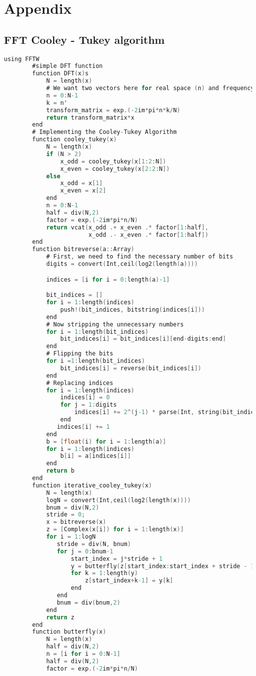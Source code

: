\appendix

\chapter{Appendix}

\label{ch:Appendix}

	\section{FFT Cooley - Tukey algorithm}
	\label{Cooley-Tukey_Code} 

	\begin{lstlisting}[language=C, caption= Cooley-Tukey with Butterfly Diagrams ]
		using FFTW
		#simple DFT function
		function DFT(x)s
		    N = length(x)
		    # We want two vectors here for real space (n) and frequency space (k)
		    n = 0:N-1
		    k = n'
		    transform_matrix = exp.(-2im*pi*n*k/N)
		    return transform_matrix*x
		end
		# Implementing the Cooley-Tukey Algorithm
		function cooley_tukey(x)
		    N = length(x)
		    if (N > 2)
		        x_odd = cooley_tukey(x[1:2:N])
		        x_even = cooley_tukey(x[2:2:N])
		    else
		        x_odd = x[1]
		        x_even = x[2]
		    end
		    n = 0:N-1
		    half = div(N,2)
		    factor = exp.(-2im*pi*n/N)
		    return vcat(x_odd .+ x_even .* factor[1:half],
		                x_odd .- x_even .* factor[1:half])
		end
		function bitreverse(a::Array)
		    # First, we need to find the necessary number of bits
		    digits = convert(Int,ceil(log2(length(a))))

		    indices = [i for i = 0:length(a)-1]

		    bit_indices = []
		    for i = 1:length(indices)
		        push!(bit_indices, bitstring(indices[i]))
		    end
		    # Now stripping the unnecessary numbers
		    for i = 1:length(bit_indices)
		        bit_indices[i] = bit_indices[i][end-digits:end]
		    end
		    # Flipping the bits
		    for i =1:length(bit_indices)
		        bit_indices[i] = reverse(bit_indices[i])
		    end
		    # Replacing indices
		    for i = 1:length(indices)
		        indices[i] = 0
		        for j = 1:digits
		            indices[i] += 2^(j-1) * parse(Int, string(bit_indices[i][end-j]))
		        end
		       indices[i] += 1
		    end
		    b = [float(i) for i = 1:length(a)]
		    for i = 1:length(indices)
		        b[i] = a[indices[i]]
		    end
		    return b
		end
		function iterative_cooley_tukey(x)
		    N = length(x)
		    logN = convert(Int,ceil(log2(length(x))))
		    bnum = div(N,2)
		    stride = 0;
		    x = bitreverse(x)
		    z = [Complex(x[i]) for i = 1:length(x)]
		    for i = 1:logN
		       stride = div(N, bnum)
		       for j = 0:bnum-1
		           start_index = j*stride + 1
		           y = butterfly(z[start_index:start_index + stride - 1])
		           for k = 1:length(y)
		               z[start_index+k-1] = y[k]
		           end
		       end
		       bnum = div(bnum,2)
		    end
		    return z
		end
		function butterfly(x)
		    N = length(x)
		    half = div(N,2)
		    n = [i for i = 0:N-1]
		    half = div(N,2)
		    factor = exp.(-2im*pi*n/N)


\end{lstlisting}
